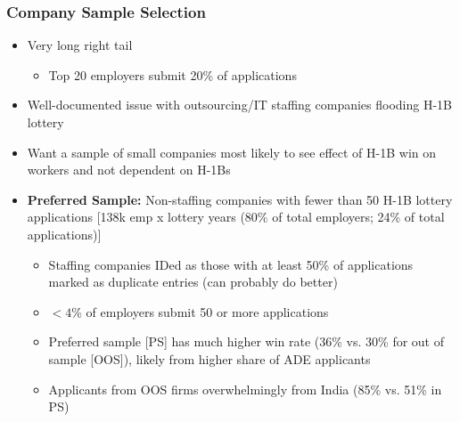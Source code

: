\documentclass[xcolor=dvipsnames, compress, 12pt, aspectratio=169, handout]{beamer}
\begin{document}
\begin{frame}
    \frametitle{Company Sample Selection}
    \begin{itemize}
        \item Very long right tail
        \begin{itemize}
            \item Top 20 employers submit 20\% of applications
        \end{itemize}
        \item Well-documented issue with outsourcing/IT staffing companies flooding H-1B lottery 
        \item Want a sample of small companies most likely to see effect of H-1B win on workers and not dependent on H-1Bs
        \item \textbf{Preferred Sample:} Non-staffing companies with fewer than 50 H-1B lottery applications [138k emp x lottery years (80\% of total employers; 24\% of total applications)]
        \begin{itemize}
            \item Staffing companies IDed as those with at least 50\% of applications marked as duplicate entries (can probably do better)
            \item $<4$\% of employers submit 50 or more applications 
            \item Preferred sample [PS] has much higher win rate (36\% vs. 30\% for out of sample [OOS]), likely from higher share of ADE applicants
            \item Applicants from OOS firms overwhelmingly from India (85\% vs. 51\% in PS) 
        \end{itemize}
    \end{itemize}
\end{frame}
\end{document}
